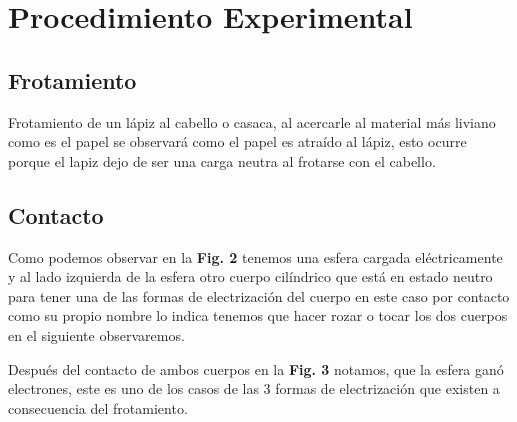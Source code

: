 \section{Procedimiento Experimental}
\subsection{Frotamiento}
Frotamiento de un lápiz al cabello o casaca, al acercarle al material más
liviano como es el papel se observará como el papel es atraído al lápiz, esto
ocurre porque el lapiz dejo de ser una carga neutra al frotarse con el cabello.
\subsection{Contacto}
Como podemos observar en la \textbf{Fig. 2} tenemos una esfera cargada
eléctricamente y al lado izquierda de la esfera otro cuerpo cilíndrico que está
en estado neutro para tener una de las formas de electrización del cuerpo en
este caso por contacto como su propio nombre lo indica tenemos que hacer rozar
o tocar los dos cuerpos en el siguiente observaremos.

Después del contacto de ambos cuerpos en la \textbf{Fig. 3} notamos, que la
esfera ganó electrones, este es uno de los casos de las 3 formas de
electrización que existen a consecuencia del frotamiento.
